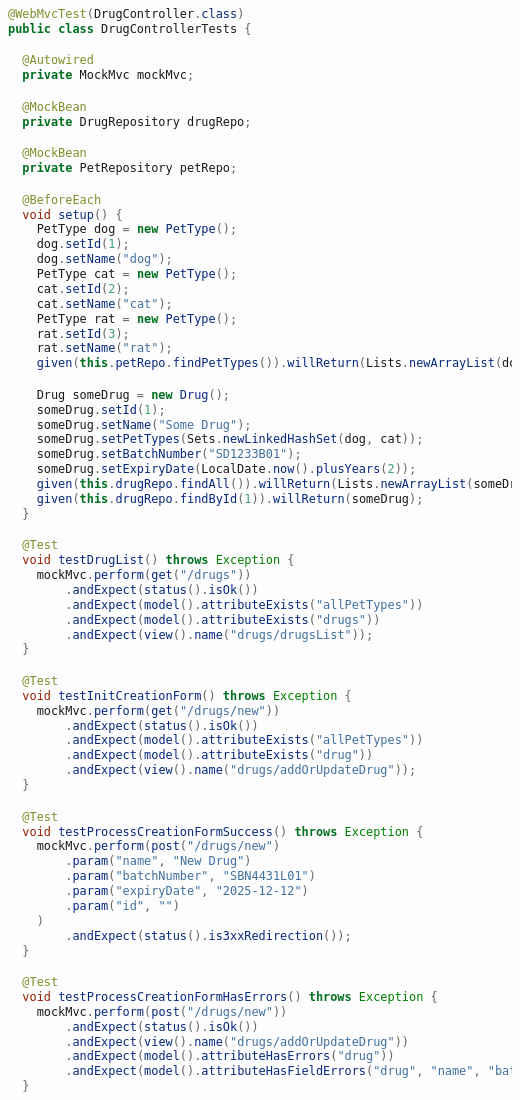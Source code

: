\documentclass[12pt, a4paper]{article}
\begin{document}
\begin{lstlisting}[language=Java, title='DrugControllerTests.java']
@WebMvcTest(DrugController.class)
public class DrugControllerTests {

  @Autowired
  private MockMvc mockMvc;

  @MockBean
  private DrugRepository drugRepo;

  @MockBean
  private PetRepository petRepo;

  @BeforeEach
  void setup() {
    PetType dog = new PetType();
    dog.setId(1);
    dog.setName("dog");
    PetType cat = new PetType();
    cat.setId(2);
    cat.setName("cat");
    PetType rat = new PetType();
    rat.setId(3);
    rat.setName("rat");
    given(this.petRepo.findPetTypes()).willReturn(Lists.newArrayList(dog, cat, rat));

    Drug someDrug = new Drug();
    someDrug.setId(1);
    someDrug.setName("Some Drug");
    someDrug.setPetTypes(Sets.newLinkedHashSet(dog, cat));
    someDrug.setBatchNumber("SD1233B01");
    someDrug.setExpiryDate(LocalDate.now().plusYears(2));
    given(this.drugRepo.findAll()).willReturn(Lists.newArrayList(someDrug));
    given(this.drugRepo.findById(1)).willReturn(someDrug);
  }

  @Test
  void testDrugList() throws Exception {
    mockMvc.perform(get("/drugs"))
        .andExpect(status().isOk())
        .andExpect(model().attributeExists("allPetTypes"))
        .andExpect(model().attributeExists("drugs"))
        .andExpect(view().name("drugs/drugsList"));
  }

  @Test
  void testInitCreationForm() throws Exception {
    mockMvc.perform(get("/drugs/new"))
        .andExpect(status().isOk())
        .andExpect(model().attributeExists("allPetTypes"))
        .andExpect(model().attributeExists("drug"))
        .andExpect(view().name("drugs/addOrUpdateDrug"));
  }

  @Test
  void testProcessCreationFormSuccess() throws Exception {
    mockMvc.perform(post("/drugs/new")
        .param("name", "New Drug")
        .param("batchNumber", "SBN4431L01")
        .param("expiryDate", "2025-12-12")
        .param("id", "")
    )
        .andExpect(status().is3xxRedirection());
  }

  @Test
  void testProcessCreationFormHasErrors() throws Exception {
    mockMvc.perform(post("/drugs/new"))
        .andExpect(status().isOk())
        .andExpect(view().name("drugs/addOrUpdateDrug"))
        .andExpect(model().attributeHasErrors("drug"))
        .andExpect(model().attributeHasFieldErrors("drug", "name", "batchNumber", "expiryDate"));
  }


\end{lstlisting}
\end{document}
